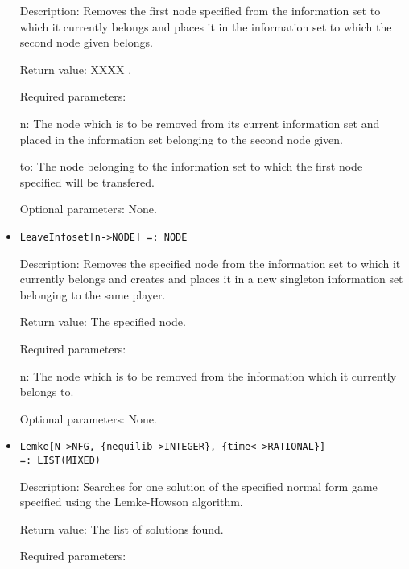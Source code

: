 \begin{itemize}
\bd
\item
[Description:] Removes the first node specified from the information set
to which it currently belongs and places it in the information set to
which the second node given belongs.
\item
[Return value:] XXXX .
\item
[Required parameters:]\hfil\null
	  
\bd
\item
[ n:] The node which is to be removed from its current information
set and placed in the information set belonging to the second
node given.
\item
[ to:] The node belonging to the information set to which the first
node specified will be transfered.
\ed

\item
[Optional parameters:] None.
\ed

\item
\protect \large \begin{verbatim}
LeaveInfoset[n->NODE] =: NODE
\end{verbatim}\normalsize

\bd
\item
[Description:] Removes the specified node from the information set to
which it currently belongs and creates and places it in a new singleton
information set belonging to the same player.
\item
[Return value:] The specified node.
\item
[Required parameters:]\hfil\null
	  
\bd
\item
[ n:] The node which is to be removed from the information which it
currently belongs to.
\ed

\item
[Optional parameters:] None.
\ed

\item
\protect \large \begin{verbatim}
Lemke[N->NFG, {nequilib->INTEGER}, {time<->RATIONAL}] 
=: LIST(MIXED)
\end{verbatim}\normalsize

\bd
\item
[Description:] Searches for one solution of the specified normal form 
game specified using the Lemke-Howson algorithm.  
\item
[Return value:] The list of solutions found.
\item
[Required parameters:]\hfil\null


\end{itemize}
